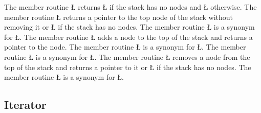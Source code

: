 \documentclass[openright,twoside]{report}
\begin{document}
The member routine \LGinlinetrue\LGbegin\lgrinde\L{}\endlgrinde\LGend{} returns \LGinlinetrue\LGbegin\lgrinde\L{}\endlgrinde\LGend{} if the stack has no nodes and \LGinlinetrue\LGbegin\lgrinde\L{}\endlgrinde\LGend{} otherwise.
The member routine \LGinlinetrue\LGbegin\lgrinde\L{}\endlgrinde\LGend{} returns a pointer to the top node of the stack without removing it or \LGinlinetrue\LGbegin\lgrinde\L{}\endlgrinde\LGend{} if the stack has no nodes.
The member routine \LGinlinetrue\LGbegin\lgrinde\L{}\endlgrinde\LGend{} is a synonym for \LGinlinetrue\LGbegin\lgrinde\L{}\endlgrinde\LGend{}.
The member routine \LGinlinetrue\LGbegin\lgrinde\L{}\endlgrinde\LGend{} adds a node to the top of the stack and returns a pointer to the node.
The member routine \LGinlinetrue\LGbegin\lgrinde\L{}\endlgrinde\LGend{} is a synonym for \LGinlinetrue\LGbegin\lgrinde\L{}\endlgrinde\LGend{}.
The member routine \LGinlinetrue\LGbegin\lgrinde\L{}\endlgrinde\LGend{} is a synonym for \LGinlinetrue\LGbegin\lgrinde\L{}\endlgrinde\LGend{}.
The member routine \LGinlinetrue\LGbegin\lgrinde\L{}\endlgrinde\LGend{} removes a node from the top of the stack and returns a pointer to it or \LGinlinetrue\LGbegin\lgrinde\L{}\endlgrinde\LGend{} if the stack has no nodes.
The member routine \LGinlinetrue\LGbegin\lgrinde\L{}\endlgrinde\LGend{} is a synonym for \LGinlinetrue\LGbegin\lgrinde\L{}\endlgrinde\LGend{}.


\subsection{Iterator}
\end{document}
